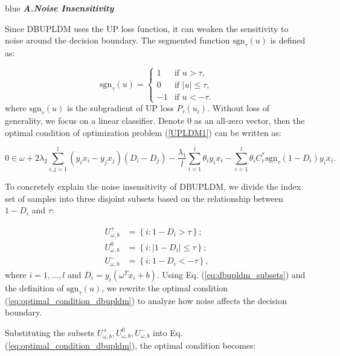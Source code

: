 \documentclass[a4paper]{cas-sc}
\begin{document}
\begin{color}{blue}
\textbf{\textit{A.Noise Insensitivity}}

 Since DBUPLDM uses the UP loss function, it can weaken the sensitivity to noise around the decision boundary.
The segmented function $\text{sgn}_\tau (u)$ is defined as:

\begin{equation}
\text{sgn}_\tau (u) = \begin{cases} 
1 & \text{if } u > \tau, \\
0 & \text{if } |u| \leq \tau, \\
-1 & \text{if } u < -\tau.
\end{cases}
\label{eq:sgn_function} 
\end{equation}
where  $\text{sgn}_\tau (u)$ is the subgradient of UP loss $P_{\tau}(u_i)$. Without loss of generality, we focus on a linear classifier. Denote 0 as an all-zero vector, then the optimal condition of optimization problem (\ref{UPLDM1}) can be written as:

\begin{equation}
0 \in \omega + 2\lambda_{2} \sum_{i,j=1}^{l} (y_{i}x_{i} - y_{j}x_{j})(D_{i} - D_{j}) - \frac{\lambda_{1}}{l} \sum_{i=1}^{l} \theta_{i} y_{i}x_{i} - \sum_{i=1}^{l} \theta_{i} C_{i}^{*} \text{sgn}_{\tau}(1 - D_{i}) y_{i}x_{i}.
\label{eq:optimal_condition_dbupldm}
\end{equation}

To concretely explain the noise insensitivity of DBUPLDM, we divide the index set of samples into three disjoint subsets based on the relationship between \(1 - D_i\) and \(\tau\):

\begin{equation}
\begin{aligned}
U_{\omega,b}^{+} &= \left\{ i : 1 - D_i > \tau \right\}; \\
U_{\omega,b}^{0} &= \left\{ i : \vert 1 - D_i \vert \leq \tau \right\}; \\
U_{\omega,b}^{-} &= \left\{ i : 1 - D_i < -\tau \right\},
\end{aligned}
\label{eq:dbupldm_subsets}  
\end{equation}
where \(i = 1, \ldots, l\) and \(D_i = y_i(\omega^T x_i + b)\). Using Eq. (\ref{eq:dbupldm_subsets}) and the definition of \(\text{sgn}_\tau(u)\), we rewrite the optimal condition (\ref{eq:optimal_condition_dbupldm}) to analyze how noise affects the decision boundary.

Substituting the subsets \( U_{\omega,b}^{+}, U_{\omega,b}^{0}, U_{\omega,b}^{-} \) into Eq. (\ref{eq:optimal_condition_dbupldm}), the optimal condition becomes:


\end{color}
\end{document}
